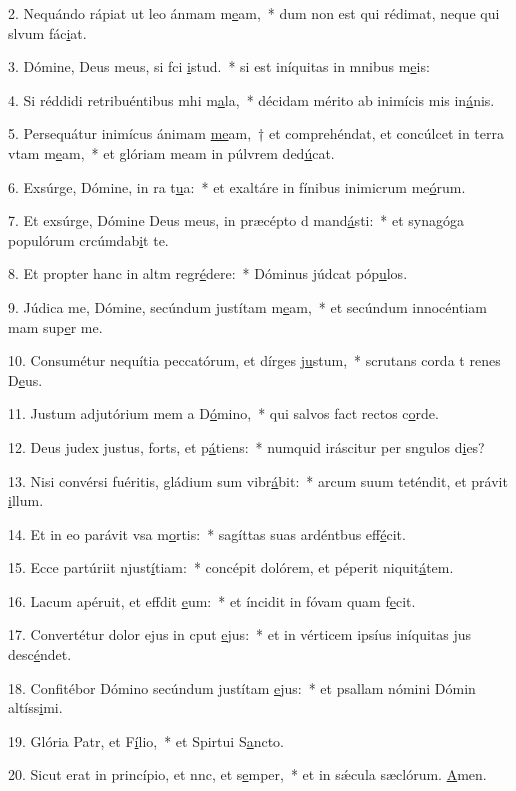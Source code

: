 2. Nequándo rápiat ut leo ánmam m\uline{e}am,~* dum non est qui rédimat, neque qui slvum fác\uline{i}at.\par 
3. Dómine, Deus meus, si fci \uline{i}stud.~* si est iníquitas in mnibus m\uline{e}is:\par 
4. Si réddidi retribuéntibus mhi m\uline{a}la,~* décidam mérito ab inimícis mis in\uline{á}nis.\par 
5. Persequátur inimícus ánimam \uline{me}am,~† et comprehéndat, et concúlcet in terra vtam m\uline{e}am,~* et glóriam meam in púlvrem ded\uline{ú}cat.\par 
6. Exsúrge, Dómine, in ra t\uline{u}a:~* et exaltáre in fínibus inimicrum me\uline{ó}rum.\par 
7. Et exsúrge, Dómine Deus meus, in præcépto d mand\uline{á}sti:~* et synagóga populórum crcúmdab\uline{i}t te.\par 
8. Et propter hanc in altm regr\uline{é}dere:~* Dóminus júdcat póp\uline{u}los.\par 
9. Júdica me, Dómine, secúndum justítam m\uline{e}am,~* et secúndum innocéntiam mam sup\uline{e}r me.\par 
10. Consumétur nequítia peccatórum, et dírges j\uline{u}stum,~* scrutans corda t renes D\uline{e}us.\par 
11. Justum adjutórium mem a D\uline{ó}mino,~* qui salvos fact rectos c\uline{o}rde.\par 
12. Deus judex justus, forts, et p\uline{á}tiens:~* numquid iráscitur per sngulos d\uline{i}es?\par 
13. Nisi convérsi fuéritis, gládium sum vibr\uline{á}bit:~* arcum suum teténdit, et právit \uline{i}llum.\par 
14. Et in eo parávit vsa m\uline{o}rtis:~* sagíttas suas ardéntbus eff\uline{é}cit.\par 
15. Ecce partúriit njust\uline{í}tiam:~* concépit dolórem, et péperit niquit\uline{á}tem.\par 
16. Lacum apéruit, et effdit \uline{e}um:~* et íncidit in fóvam quam f\uline{e}cit.\par 
17. Convertétur dolor ejus in cput \uline{e}jus:~* et in vérticem ipsíus iníquitas jus desc\uline{é}ndet.\par 
18. Confitébor Dómino secúndum justítam \uline{e}jus:~* et psallam nómini Dómin altíss\uline{i}mi.\par 
19. Glória Patr, et F\uline{í}lio,~* et Spirtui S\uline{a}ncto.\par 
20. Sicut erat in princípio, et nnc, et s\uline{e}mper,~* et in sǽcula sæclórum. \uline{A}men.\par 
